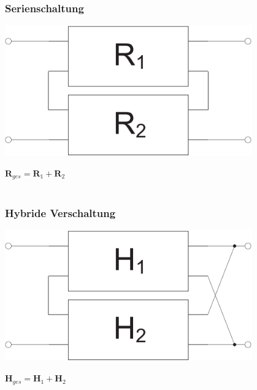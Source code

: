 \documentclass[a4paper,twocolumn,10pt]{article}
\begin{document}
\subsubsection*{Serienschaltung}
\begin{minipage}[b]{0.23\textwidth}
\includegraphics[width=0.8\textwidth]{Grafiken/Zweitor_Seriell}
\end{minipage}
\hfill
\begin{minipage}[b]{0.23\textwidth}
$\textbf{R}_{ges}=\textbf{R}_1+\textbf{R}_2$\\\\
\end{minipage}

\subsubsection*{Hybride Verschaltung}
\begin{minipage}[b]{0.23\textwidth}
\includegraphics[width=0.8\textwidth]{Grafiken/Zweitor_Hybrid}
\end{minipage}
\hfill
\begin{minipage}[b]{0.23\textwidth}
$\textbf{H}_{ges}=\textbf{H}_1+\textbf{H}_2$\\\\
\end{minipage}
\end{document}
